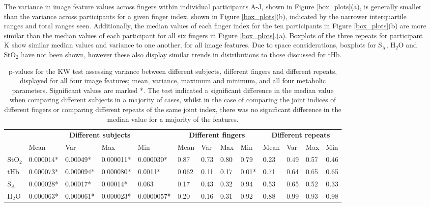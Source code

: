 \documentclass[twoside]{bhamthesis}
\theoremstyle{definition}
\begin{document}
The variance in image feature values across fingers within individual participants A-J, shown in Figure \ref{box_plots}(a), is generally smaller than the variance across participants for a given finger index, shown in Figure \ref{box_plots}(b), indicated by the narrower interquartile ranges and total ranges seen. Additionally, the median values of each finger index for the ten participants in Figure \ref{box_plots}(b) are more similar than the median values of each participant for all six fingers in Figure \ref{box_plots}.(a). Boxplots of the three repeats for participant K show similar median values and variance to one another, for all image features. Due to space considerations, boxplots for $\mathrm{S_A}$, $\mathrm{H_2O}$ and $\mathrm{StO_2}$ have not been shown, however these also display similar trends in distributions to those discussed for tHb.

\bgroup
\def\arraystretch{1.4}
\begin{table}[!ht]
\footnotesize
\caption{p-values for the KW test assessing variance between different subjects, different fingers and different repeats, displayed for all four image features; mean, variance, maximum and minimum, and all four metabolic parameters. Significant values are marked *. The test indicated a significant difference in the median value when comparing different subjects in a majority of cases, whilst in the case of comparing the joint indices of different fingers or comparing different repeats of the same joint index, there was no significant difference in the median value for a majority of the features.}
\begin{center}
 \begin{tabular}{|p{0.6cm}|  p{1.4cm} p{1.4cm} p{1.4cm} p{1.4cm}| p{0.6cm} p{0.6cm} p{0.6cm} p{0.6cm}| p{0.5cm} p{0.5cm} p{0.5cm} p{0.5cm}|} 
 \hline 
 & \multicolumn{4}{c|}{\textbf{Different subjects}}  & \multicolumn{4}{c|}{\textbf{Different fingers}} & \multicolumn{4}{c|}{\textbf{Different repeats}}  \\ 
 & Mean & Var & Max & Min & Mean & Var & Max & Min & Mean & Var & Max & Min \\ [1ex] 
 \hline
 StO$_2$ & 0.000014* & 0.00049* & 0.000011* & 0.000030* & 0.87 & 0.73 & 0.80 & 0.79  & 0.23 & 0.49 & 0.57 & 0.46 \\ 
 tHb &  0.000073* & 0.000094* & 0.000080* & 0.0011* & 0.062 & 0.11 & 0.17 & 0.01* & 0.71 & 0.64 & 0.65 & 0.65 \\
 S$_A$ & 0.000028* & 0.00017* & 0.00014* & 0.063  & 0.17 & 0.43 & 0.32 & 0.94 & 0.53 & 0.65 & 0.52 & 0.33 \\
 H$_2$O & 0.000063* & 0.000061* & 0.000023* & 0.0000057*  & 0.20 & 0.16 & 0.31 & 0.92 & 0.88 & 0.99 & 0.93 & 0.98 \\
 \hline
\end{tabular}
\end{center}
\label{Variability_table}
\end{table}
\end{document}
